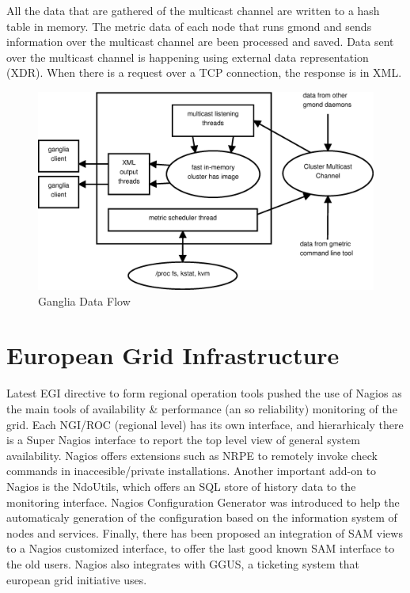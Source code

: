 All the data that are gathered of the multicast channel are written to a hash table in memory. The metric data of each node that runs gmond and sends information over the multicast channel are been processed and saved. Data sent over the multicast channel is happening using external data representation (XDR). When there is a request over a TCP connection, the response is in XML.


\begin{figure}[h]
\centering
 \includegraphics[width=6in]{images/ganglia.eps}
\caption{Ganglia Data Flow}
\label{figure:gma}
\end{figure}

\section{European Grid Infrastructure}
Latest EGI directive to form regional operation tools pushed the use of Nagios \cite{imamagic2007grid} as the main tools of availability \& performance (an so reliability) monitoring of the grid. Each NGI/ROC (regional level) has its own interface, and hierarhicaly there is a Super Nagios interface to report the top level view of general system availability. Nagios offers extensions such as NRPE to remotely invoke check commands in inaccesible/private installations. Another important add-on to Nagios is the NdoUtils, which offers an SQL store of history data to the monitoring interface. Nagios Configuration Generator was introduced to help the automaticaly generation of the configuration based on the information system of nodes and services. Finally, there has been proposed an integration of SAM views to a Nagios customized interface, to offer the last good known SAM interface to the old users. Nagios also integrates with GGUS, a ticketing system that european grid initiative uses.

